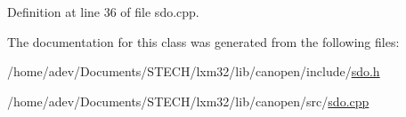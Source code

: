 Definition at line 36 of file sdo.\+cpp.



The documentation for this class was generated from the following files\+:\begin{DoxyCompactItemize}
\item 
/home/adev/\+Documents/\+S\+T\+E\+C\+H/lxm32/lib/canopen/include/\hyperlink{sdo_8h}{sdo.\+h}\item 
/home/adev/\+Documents/\+S\+T\+E\+C\+H/lxm32/lib/canopen/src/\hyperlink{sdo_8cpp}{sdo.\+cpp}\end{DoxyCompactItemize}
